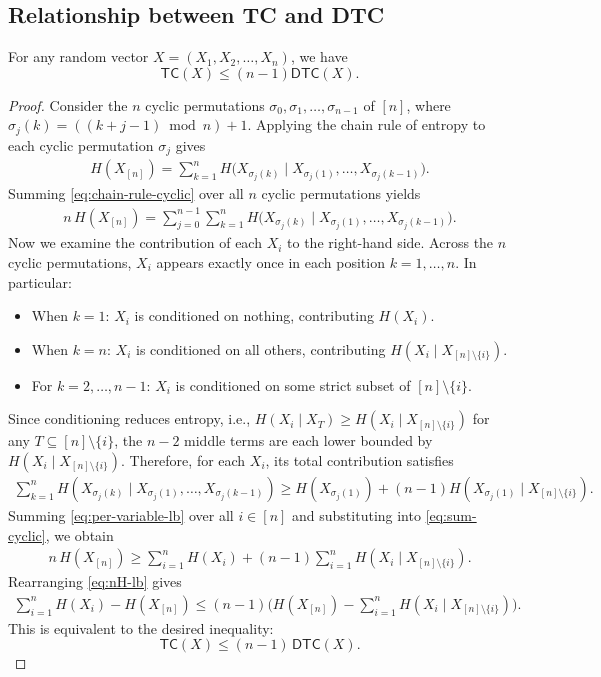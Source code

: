\documentclass[english]{article}
\newcommand{\TC}{\mathsf{TC}}
\newcommand{\DTC}{\mathsf{DTC}}
\begin{document}
\subsection{Relationship between TC and DTC}
\label{sec:proof-dtc-tc-relation}
\begin{lemma}
\label{lem:dtc-tc-relation}
For any random vector $X = (X_1, X_2, \ldots, X_n)$, we have
\[
    \TC(X) \leq (n-1)\DTC(X).
\]
\end{lemma}
\begin{proof}
Consider the $n$ cyclic permutations $\sigma_0, \sigma_1, \ldots, \sigma_{n-1}$ of $[n]$, where $\sigma_j(k) = ((k + j - 1) \bmod n) + 1$. Applying the chain rule of entropy to each cyclic permutation $\sigma_j$ gives
\begin{align}
    H(X_{[n]}) = \sum_{k=1}^n H\big(X_{\sigma_j(k)} \mid X_{\sigma_j(1)}, \ldots, X_{\sigma_j(k-1)}\big). \label{eq:chain-rule-cyclic}
\end{align}
Summing \eqref{eq:chain-rule-cyclic} over all $n$ cyclic permutations yields
\begin{align}
    n \, H(X_{[n]}) = \sum_{j=0}^{n-1} \sum_{k=1}^n H\big(X_{\sigma_j(k)} \mid X_{\sigma_j(1)}, \ldots, X_{\sigma_j(k-1)}\big). \label{eq:sum-cyclic}
\end{align}
Now we examine the contribution of each $X_i$ to the right-hand side. Across the $n$ cyclic permutations, $X_i$ appears exactly once in each position $k = 1, \ldots, n$. In particular:
\begin{itemize}
    \item When $k = 1$: $X_i$ is conditioned on nothing, contributing $H(X_i)$.
    \item When $k = n$: $X_i$ is conditioned on all others, contributing $H(X_i \mid X_{[n] \setminus \{i\}})$.
    \item For $k = 2, \ldots, n-1$: $X_i$ is conditioned on some strict subset of $[n] \setminus \{i\}$.
\end{itemize}
Since conditioning reduces entropy, i.e., $H(X_i \mid X_T) \geq H(X_i \mid X_{[n] \setminus \{i\}})$ for any $T \subseteq [n] \setminus \{i\}$, the $n - 2$ middle terms are each lower bounded by $H(X_i \mid X_{[n] \setminus \{i\}})$. Therefore, for each $X_i$, its total contribution satisfies
\begin{align}
    \sum_{k=1}^n H(X_{\sigma_j(k)} \mid X_{\sigma_j(1)}, \ldots, X_{\sigma_j(k-1)}) \geq H(X_{\sigma_j(1)} ) + (n-1) H(X_{\sigma_j(1)}  \mid X_{[n] \setminus \{i\}}). \label{eq:per-variable-lb}
\end{align}
Summing \eqref{eq:per-variable-lb} over all $i \in [n]$ and substituting into \eqref{eq:sum-cyclic}, we obtain
\begin{align}
    n \, H(X_{[n]}) \geq \sum_{i=1}^n H(X_i) + (n-1) \sum_{i=1}^n H(X_i \mid X_{[n] \setminus \{i\}}). \label{eq:nH-lb}
\end{align}
Rearranging \eqref{eq:nH-lb} gives
\begin{align*}
    \sum_{i=1}^n H(X_i) - H(X_{[n]}) \leq (n-1) \bigg(H(X_{[n]}) - \sum_{i=1}^n H(X_i \mid X_{[n] \setminus \{i\}}) \bigg).
\end{align*}
This is equivalent to the desired inequality:
\[
    \TC(X) \leq (n-1)\,\DTC(X).
\]
\end{proof}
\end{document}
